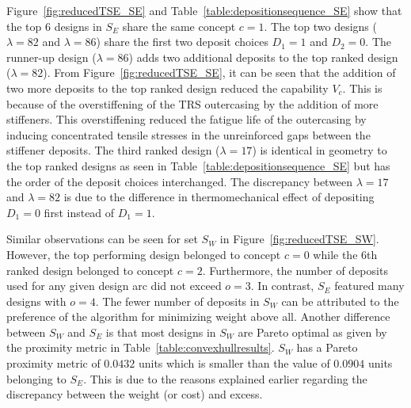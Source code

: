Figure~\ref{fig:reducedTSE_SE} and Table~\ref{table:depositionsequence_SE} show that the top 6 designs in $S_E$ share the same concept $c=1$. The top two designs ($\lambda = 82$ and $\lambda = 86$) share the first two deposit choices $D_1=1$ and $D_2=0$. The runner-up design ($\lambda = 86$) adds two additional deposits to the top ranked design ($\lambda = 82$). From Figure~\ref{fig:reducedTSE_SE}, it can be seen that the addition of two more deposits to the top ranked design reduced the capability $V_c$. This is because of the overstiffening of the \ac{TRS} outercasing by the addition of more stiffeners. This overstiffening reduced the fatigue life of the outercasing by inducing concentrated tensile stresses in the unreinforced gaps between the stiffener deposits. The third ranked design ($\lambda = 17$) is identical in geometry to the top ranked designs as seen in Table~\ref{table:depositionsequence_SE} but has the order of the deposit choices interchanged. The discrepancy between $\lambda = 17$ and $\lambda = 82$ is due to the difference in thermomechanical effect of depositing $D_1=0$ first instead of $D_1=1$.

Similar observations can be seen for set $S_W$ in Figure~\ref{fig:reducedTSE_SW}. However, the top performing design belonged to concept $c=0$ while the 6th ranked design belonged to concept $c=2$. Furthermore, the number of deposits used for any given design arc did not exceed $o=3$. In contrast, $S_E$ featured many designs with $o=4$. The fewer number of deposits in $S_W$ can be attributed to the preference of the algorithm for minimizing weight above all. Another difference between $S_W$ and $S_E$ is that most designs in $S_W$ are Pareto optimal as given by the proximity metric in Table~\ref{table:convexhullresults}. $S_W$ has a Pareto proximity metric of $0.0432$ units which is smaller than the value of $0.0904$ units belonging to $S_E$. This is due to the reasons explained earlier regarding the discrepancy between the weight (or cost) and excess. 


\newcommand{\resultsCW}{1.7cm}
\newcommand{\dARA}{\texttt{[image: table\_E\_results/C1D1.pdf]}}
\newcommand{\dBRA}{\texttt{[image: table\_E\_results/C1D10.pdf]}}

